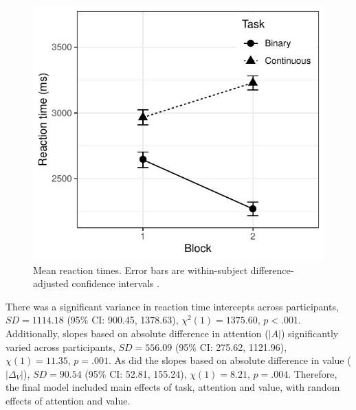 \documentclass[12pt]{article}
\begin{document}
\begin{figure}
	\centering
	\includegraphics{images/RTorderEffects.pdf}
	\caption{Mean reaction times. Error bars are within-subject difference-adjusted confidence intervals \protect\cite{Baguley2012}.}
	\label{figure:RTblockGraph}
\end{figure}



There was a significant variance in reaction time intercepts across participants, $SD=1114.18$ (95\% CI: 900.45, 1378.63), $\chi^2(1)=1375.60$, $p<.001$. Additionally, slopes based on absolute difference in attention ($|A|$) significantly varied across participants, $SD=556.09$ (95\% CI: 275.62, 1121.96), $\chi(1)=11.35$, $p=.001$. As did the slopes based on absolute difference in value ($|\Delta_V|$), $SD=90.54$ (95\% CI: 52.81, 155.24), $\chi(1)=8.21$, $p=.004$. Therefore, the final model included main effects of task, attention and value, with random effects of attention and value. 



\end{document}
